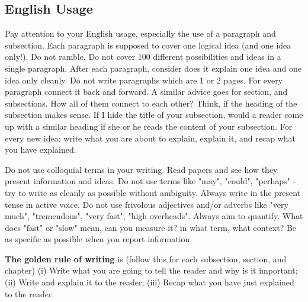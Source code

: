 \subsection*{English Usage}
Pay attention to your English usage, especially the use of a paragraph and subsection. Each paragraph is supposed 
to cover one logical idea (and one idea only!). Do not ramble. Do not cover 100 different possibilities and ideas 
in a single paragraph. After each paragraph, consider does it explain one idea and one idea only cleanly. Do not 
write paragraphs which are 1 or 2 pages. For every paragraph connect it back and forward. A similar advice goes for 
section, and subsections. How all of them connect to each other? Think, if the heading of the subsection makes sense. 
If I hide the title of your subsection, would a reader come up with a similar heading if she or he reads the content 
of your subsection. For every new idea: write what you are about to explain, explain it, and recap what you have 
explained. 


Do not use colloquial terms in your writing. Read papers and see how they present information and ideas. Do not 
use terms like "may", "could", "perhaps" - try to write as cleanly as possible without ambiguity. 
Always write in the present tense in active voice. Do not use frivolous adjectives and/or adverbs like 
"very much", "tremendous", "very fast", "high overheads". Always aim to quantify. What does "fast" or  "slow" mean, 
can you measure it? in what term, what context? Be as specific as possible when you report information. 


\textbf{The golden rule of writing} is (follow this for each subsection, section, and chapter) 
(i) Write what you are going to tell the reader and why is it important; 
(ii) Write and explain it to the reader; 
(iii) Recap what you have just explained to the reader.  



